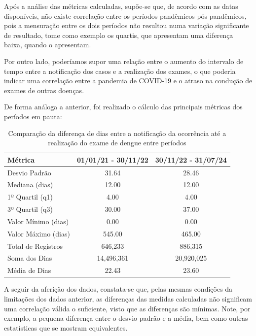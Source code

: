 \documentclass[a4paper, 12pt, twoside]{article}
\begin{document}
Após a análise das métricas calculadas, supõe-se que, de acordo com as datas disponíveis, não existe correlação entre os períodos pandêmicos pós-pandêmicos, pois a mensuração entre os dois períodos não resultou numa variação significante de resultado, tome como exemplo os quartis, que apresentam uma diferença baixa, quando o apresentam.

Por outro lado, poderíamos supor uma relação entre o aumento do intervalo de tempo entre a notificação dos casos e a realização dos exames, o que poderia indicar uma correlação entre a pandemia de COVID-19 e o atraso na condução de exames de outras doenças. 

De forma análoga a anterior, foi realizado o cálculo das principais métricas dos períodos em pauta:

\begin{table}[H]
\centering
\caption{Comparação da diferença de dias entre a notificação da ocorrência até a realização do exame de dengue entre períodos}
\begin{tabular}{@{}l S[table-format=3.2] S[table-format=3.2]@{}}
\toprule
\textbf{Métrica}          & \textbf{01/01/21 - 30/11/22} & \textbf{30/11/22 - 31/07/24} \\ \midrule
Desvio Padrão  & 31.64              & 28.46              \\
Mediana (dias)            & 12.00              & 12.00              \\
1º Quartil (q1)           & 4.00               & 4.00               \\
3º Quartil (q3)           & 30.00              & 37.00              \\
Valor Mínimo (dias)       & 0.00               & 0.00               \\
Valor Máximo (dias)       & 545.00             & 465.00             \\
Total de Registros        & 646,233            & 886,315            \\
Soma dos Dias             & 14,496,361         & 20,920,025         \\
Média de Dias             & 22.43              & 23.60              \\ \bottomrule
\end{tabular}
\label{tab:comparison}
\end{table} 

A seguir da aferição dos dados, constata-se que, pelas mesmas condições da limitações dos dados anterior, as diferenças das medidas calculadas não significam uma correlação válida o suficiente, visto que as diferenças são mínimas. Note, por exemplo, a pequena diferença entre o desvio padrão e a média, bem como outras estatísticas que se mostram equivalentes. 
\end{document}
